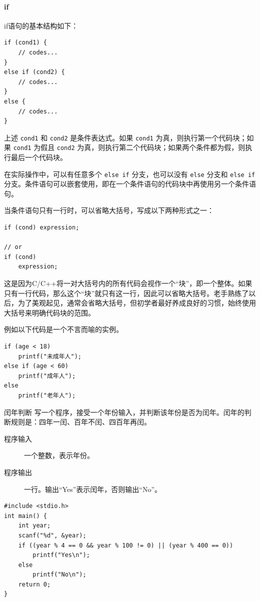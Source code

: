 \paragraph{if} if语句的基本结构如下：

\begin{verbatim}
if (cond1) {
    // codes...
}
else if (cond2) {
    // codes...
}
else {
    // codes...
}
\end{verbatim}

上述 \verb|cond1| 和 \verb|cond2| 是条件表达式。如果 \verb|cond1| 为真，则执行第一个代码块；如果 \verb|cond1| 为假且 \verb|cond2| 为真，则执行第二个代码块；如果两个条件都为假，则执行最后一个代码块。

在实际操作中，可以有任意多个 \verb|else if| 分支，也可以没有 \verb|else| 分支和 \verb|else if| 分支。条件语句可以嵌套使用，即在一个条件语句的代码块中再使用另一个条件语句。

当条件语句只有一行时，可以省略大括号，写成以下两种形式之一：
\begin{verbatim}
if (cond) expression;

// or
if (cond)
    expression;
\end{verbatim}
这是因为C/C++将一对大括号内的所有代码会视作一个“块”，即一个整体。如果只有一行代码，那么这个“块”就只有这一行，因此可以省略大括号。老手熟练了以后，为了美观起见，通常会省略大括号，但初学者最好养成良好的习惯，始终使用大括号来明确代码块的范围。

例如以下代码是一个不言而喻的实例。
\begin{verbatim}
if (age < 18) 
    printf("未成年人");
else if (age < 60) 
    printf("成年人");
else 
    printf("老年人");
\end{verbatim}

\begin{example}{闰年判断}{}
    写一个程序，接受一个年份输入，并判断该年份是否为闰年。闰年的判断规则是：四年一闰、百年不闰、四百年再闰。
    \begin{description}
        \item[程序输入] 一个整数，表示年份。
        \item[程序输出] 一行。输出“Yes”表示闰年，否则输出“No”。  
    \end{description}
    \tcblower
    \begin{verbatim}
#include <stdio.h>
int main() {
    int year;
    scanf("%d", &year);
    if ((year % 4 == 0 && year % 100 != 0) || (year % 400 == 0)) 
        printf("Yes\n");
    else
        printf("No\n");
    return 0;
}
    \end{verbatim}
\end{example}

